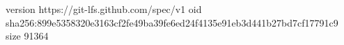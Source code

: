 version https://git-lfs.github.com/spec/v1
oid sha256:899e5358320e3163cf2fe49ba39fe6ed24f4135e91eb3d441b27bd7cf17791c9
size 91364
